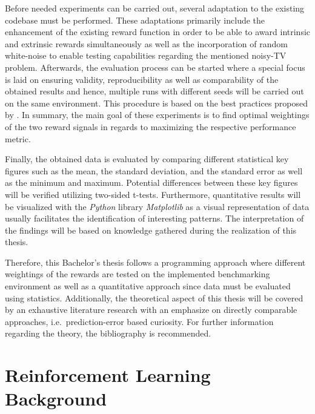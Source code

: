 \documentclass[draft,final]{vutinfth} %
\begin{document}
    Before needed experiments can be carried out, several adaptation to the existing codebase must be performed.
    These adaptations primarily include the enhancement of the existing reward function in order to be able to award intrinsic and extrinsic rewards simultaneously as well as the incorporation of random white-noise to enable testing capabilities regarding the mentioned noisy-TV problem.
    Afterwards, the evaluation process can be started where a special focus is laid on ensuring validity, reproducibility as well as comparability of the obtained results and hence, multiple runs with different seeds will be carried out on the same environment.
    This procedure is based on the best practices proposed by \citeauthor{francois-lavet_introduction_2018}.
    In summary, the main goal of these experiments is to find optimal weightings of the two reward signals in regards to maximizing the respective performance metric.

    Finally, the obtained data is evaluated by comparing different statistical key figures such as the mean, the standard deviation, and the standard error as well as the minimum and maximum.
    Potential differences between these key figures will be verified utilizing two-sided t-tests.
    Furthermore, quantitative results will be visualized with the \textit{Python} library \textit{Matplotlib} as a visual representation of data usually facilitates the identification of interesting patterns.
    The interpretation of the findings will be based on knowledge gathered during the realization of this thesis.

    Therefore, this Bachelor's thesis follows a programming approach where different weightings of the rewards are tested on the implemented benchmarking environment as well as a quantitative approach since data must be evaluated using statistics.
    Additionally, the theoretical aspect of this thesis will be covered by an exhaustive literature research with an emphasize on directly comparable approaches, i.e.\ prediction-error based curiosity.
    For further information regarding the theory, the bibliography is recommended.

    \glsresetall

    \chapter{Reinforcement Learning Background}\label{ch:reinforcement-learning-background}
\end{document}
